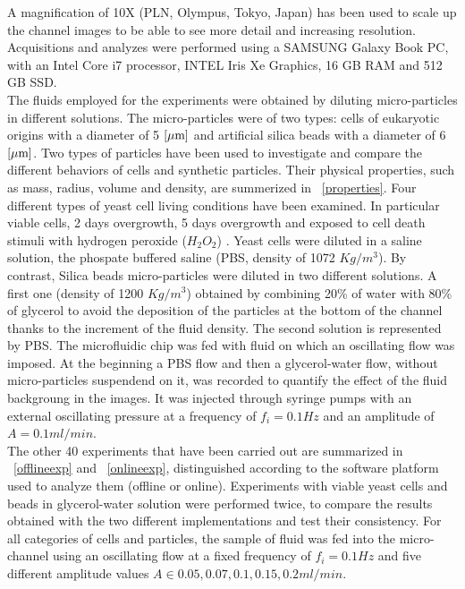 \documentclass[journal]{IEEEtran}
\theoremstyle{definition}
\theoremstyle{remark}
\begin{document}
A magnification of 10X (PLN, Olympus, Tokyo, Japan) has been used to scale up the channel images to be able to see more detail and increasing resolution.
Acquisitions and analyzes were performed using a SAMSUNG Galaxy Book PC, with an Intel Core i7 processor, INTEL Iris Xe Graphics, 16 GB RAM and 512 GB SSD.
\\The fluids employed for the experiments were obtained by diluting micro-particles in different solutions. The micro-particles were of two types: cells of eukaryotic origins with a diameter of 5 $[\rm\mu m]$ and artificial silica beads with a diameter of 6 $[\rm\mu m]$. Two types of particles have been used to investigate and compare the different behaviors of cells and synthetic particles. Their physical properties, such as mass, radius, volume and density, are summerized in ~\tab\ref{properties}. Four different types of yeast cell living conditions have been examined. In particular viable cells, 2 days overgrowth, 5 days overgrowth and exposed to cell death stimuli with hydrogen peroxide ($H_2O_2$) . 
Yeast cells were diluted in a saline solution, the phospate buffered saline (PBS, density of 1072 $Kg/m^3$). By contrast, Silica beads micro-particles were diluted in two different solutions. A first one (density of 1200 $Kg/m^3$) obtained by combining 20\% of water with 80\% of glycerol to avoid the deposition of the particles at the bottom of the channel thanks to the increment of the fluid density. The second solution is represented by PBS.
The microfluidic chip was fed with fluid on which an oscillating flow was imposed.
At the beginning a PBS flow and then a glycerol-water flow, without micro-particles suspendend on it, was recorded to quantify the effect of the fluid backgroung in the images. It was injected through syringe pumps with an external oscillating pressure at a frequency of $f_i= 0.1 Hz$ and an amplitude of $A=0.1 ml/min$.  
\\The other 40 experiments that have been carried out are summarized in ~\tab\ref{offlineexp} and ~\tab\ref{onlineexp}, distinguished according to the software platform used to analyze them (offline or online). Experiments with viable yeast cells and beads in glycerol-water solution were performed twice, to compare the results obtained with the two different implementations and test their consistency.
For all categories of cells and particles, the sample of fluid was fed into the micro-channel using an oscillating flow at a fixed frequency of $f_i= 0.1 Hz$ and five different amplitude values $A \in{0.05, 0.07, 0.1, 0.15, 0.2 ml/min}$. 
\end{document}
